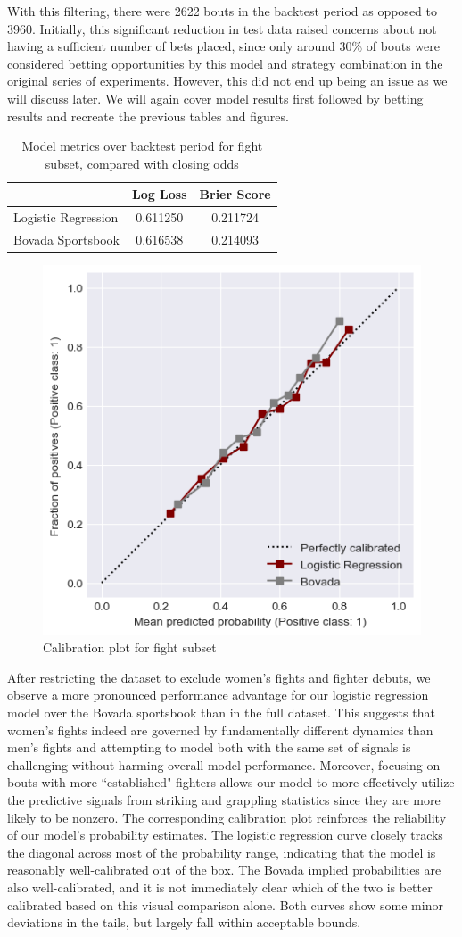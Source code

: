 \documentclass[12pt,twoside]{report}
\begin{document}
With this filtering, there were 2622 bouts in the backtest period as opposed to 3960. Initially, this significant reduction in test data raised concerns about not having a sufficient number of bets placed, since only around 30\% of bouts were considered betting opportunities by this model and strategy combination in the original series of experiments. However, this did not end up being an issue as we will discuss later. We will again cover model results first followed by betting results and recreate the previous tables and figures.

\begin{table}[!htb]
\centering
\begin{tabular}{@{}lcc@{}}
\toprule
                    & Log Loss & Brier Score \\ \midrule
Logistic Regression & 0.611250 & 0.211724    \\
Bovada Sportsbook   & 0.616538 & 0.214093    \\ \bottomrule
\end{tabular}
\caption{Model metrics over backtest period for fight subset, compared with closing odds}
\end{table}

\begin{figure}[!htb]
    \centering
    \includegraphics[width=0.45\linewidth]{figures/calib_case_study.png}   
    \caption{Calibration plot for fight subset}
\end{figure}

After restricting the dataset to exclude women's fights and fighter debuts, we observe a more pronounced performance advantage for our logistic regression model over the Bovada sportsbook than in the full dataset. This suggests that women's fights indeed are governed by fundamentally different dynamics than men's fights and attempting to model both with the same set of signals is challenging without harming overall model performance. Moreover, focusing on bouts with more ``established" fighters allows our model to more effectively utilize the predictive signals from striking and grappling statistics since they are more likely to be nonzero. The corresponding calibration plot reinforces the reliability of our model’s probability estimates. The logistic regression curve closely tracks the diagonal across most of the probability range, indicating that the model is reasonably well-calibrated out of the box. The Bovada implied probabilities are also well-calibrated, and it is not immediately clear which of the two is better calibrated based on this visual comparison alone. Both curves show some minor deviations in the tails, but largely fall within acceptable bounds.
\end{document}
